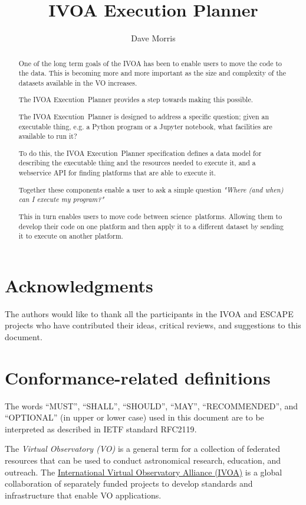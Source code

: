 \documentclass[11pt,a4paper]{ivoa}
\title{IVOA Execution Planner}
\author[http://www.ivoa.net/twiki/bin/view/IVOA/DaveMorris]
       {Dave Morris}
\newcommand{\webservice} {webservice}
\newcommand{\ivoa} {IVOA}
\newcommand{\executionplanner} {Execution~Planner}
\newcommand{\jupyternotebook} {Jupyter notebook}
\newcommand{\python} {Python}
\newcommand{\footurl}[1] {\footnote{\url{#1}}}
\newcommand{\dataset} {dataset}
\newcommand{\scienceplatform} {science~platform}
\begin{document}
\begin{abstract}
\label{abstract}

One of the long term goals of the IVOA has been to enable users to
move the code to the data.
This is becoming more and more important as the size and complexity
of the \dataset{}s available in the VO increases.

The \ivoa{} \executionplanner{} provides a step towards making this possible.

The \ivoa{} \executionplanner{} is designed to address a specific question;
given an executable thing, e.g. a \python{} program or a \jupyternotebook{},
what facilities are available to run it?

To do this, the \ivoa{} \executionplanner{} specification defines
a data model for describing the executable thing
and the resources needed to execute it,
and a \webservice{} API for finding platforms
that are able to execute it.

Together these components enable a user to ask a simple question
\textit{"Where (and when) can I execute my program?"}

This in turn enables users to move code between \scienceplatform{}s.
Allowing them to develop their code on one platform and then apply it to a different
\dataset{} by sending it to execute on another platform.

\end{abstract}

\section*{Acknowledgments}
\label{acknowledgments}

The authors would like to thank all the participants in the IVOA and ESCAPE projects
who have contributed their ideas, critical reviews, and suggestions to this document.

\section*{Conformance-related definitions}

The words ``MUST'', ``SHALL'', ``SHOULD'', ``MAY'', ``RECOMMENDED'', and
``OPTIONAL'' (in upper or lower case) used in this document are to be
interpreted as described in IETF standard RFC2119\citep{std:RFC2119}.

The \emph{Virtual Observatory (VO)} is a general term for a collection of
federated resources that can be used to conduct astronomical research,
education, and outreach.
The \href{https://www.ivoa.net}{International Virtual Observatory Alliance (IVOA)}
is a global collaboration of separately funded projects to develop standards and
infrastructure that enable VO applications.
\end{document}
